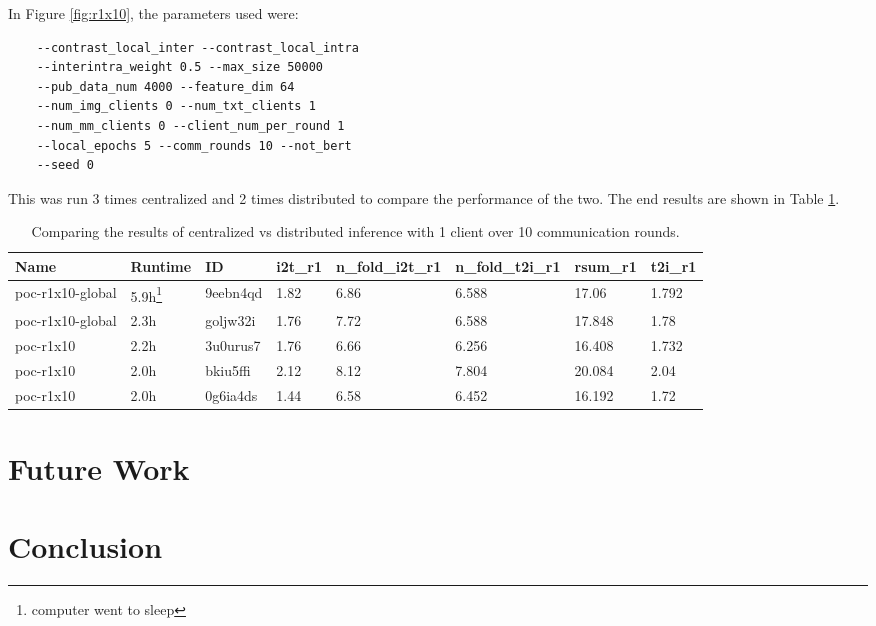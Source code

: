 \documentclass{article}
\begin{document}
In Figure \ref{fig:r1x10}, the parameters used were: 
\begin{lstlisting}
    --contrast_local_inter --contrast_local_intra 
    --interintra_weight 0.5 --max_size 50000 
    --pub_data_num 4000 --feature_dim 64 
    --num_img_clients 0 --num_txt_clients 1 
    --num_mm_clients 0 --client_num_per_round 1 
    --local_epochs 5 --comm_rounds 10 --not_bert 
    --seed 0
\end{lstlisting}
This was run 3 times centralized and 2 times distributed to compare the performance of the two. The end results are shown in Table \ref{table:r1x10}.

\begin{table}
    \centering
    \begin{tabular}{|l|l|l|l|l|l|l|l|}
    \hline
    Name & Runtime & ID & i2t\_r1 & n\_fold\_i2t\_r1 & n\_fold\_t2i\_r1 & rsum\_r1 & t2i\_r1 \\
    \hline
    poc-r1x10-global & 5.9h\footnote{computer went to sleep} & 9eebn4qd & 1.82 & 6.86 & 6.588 & 17.06 & 1.792 \\
    poc-r1x10-global & 2.3h & goljw32i & 1.76 & 7.72 & 6.588 & 17.848 & 1.78 \\
    poc-r1x10 & 2.2h & 3u0urus7 & 1.76 & 6.66 & 6.256 & 16.408 & 1.732 \\
    poc-r1x10 & 2.0h & bkiu5ffi & 2.12 & 8.12 & 7.804 & 20.084 & 2.04 \\
    poc-r1x10 & 2.0h & 0g6ia4ds & 1.44 & 6.58 & 6.452 & 16.192 & 1.72 \\
    \hline
    \end{tabular}
    \caption{Comparing the results of centralized vs distributed inference with 1 client over 10 communication rounds.}
    \label{table:r1x10}
\end{table}




\section{Future Work}

\section{Conclusion}
\end{document}
